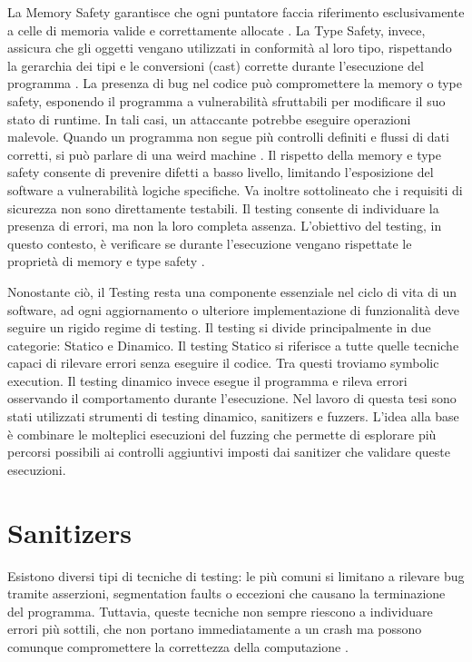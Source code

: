 La Memory Safety garantisce che ogni puntatore faccia riferimento esclusivamente a celle di memoria valide e correttamente allocate \cite{ref4}. La Type Safety, invece, assicura che gli oggetti vengano utilizzati in conformità al loro tipo, rispettando la gerarchia dei tipi e le conversioni (cast) corrette durante l’esecuzione del programma \cite{ref5}.
La presenza di bug nel codice può compromettere la memory o type safety, esponendo il programma a vulnerabilità sfruttabili per modificare il suo stato di runtime. In tali casi, un attaccante potrebbe eseguire operazioni malevole. Quando un programma non segue più controlli definiti e flussi di dati corretti, si può parlare di una weird machine \cite{ref2}. 
Il rispetto della memory e type safety consente di prevenire difetti a basso livello, limitando l’esposizione del software a vulnerabilità logiche specifiche.
Va inoltre sottolineato che i requisiti di sicurezza non sono direttamente testabili. Il testing consente di individuare la presenza di errori, ma non la loro completa assenza. L’obiettivo del testing, in questo contesto, è verificare se durante l’esecuzione vengano rispettate le proprietà di memory e type safety \cite{ref6}.

Nonostante ciò, il Testing resta una componente essenziale nel ciclo di vita di un software, ad ogni aggiornamento o ulteriore implementazione di funzionalità deve seguire un rigido regime di testing. Il testing si divide principalmente in due categorie: Statico e Dinamico.
Il testing Statico si riferisce a tutte quelle tecniche capaci di rilevare errori senza eseguire il codice. Tra questi troviamo symbolic execution. Il testing dinamico invece esegue il programma e rileva errori osservando il comportamento durante l’esecuzione. Nel lavoro di questa tesi sono stati utilizzati strumenti di testing dinamico, sanitizers e fuzzers. L’idea alla base è combinare le molteplici esecuzioni del fuzzing che permette di esplorare più percorsi possibili ai controlli aggiuntivi imposti dai sanitizer che validare queste esecuzioni. 

\section{Sanitizers}

Esistono diversi tipi di tecniche di testing: le più comuni si limitano a rilevare bug tramite asserzioni, segmentation faults o eccezioni che causano la terminazione del programma. Tuttavia, queste tecniche non sempre riescono a individuare errori più sottili, che non portano immediatamente a un crash ma possono comunque compromettere la correttezza della computazione \cite{ref1}.

